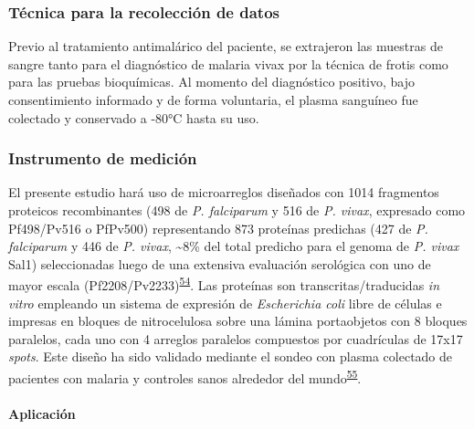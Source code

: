 \documentclass[]{article}
\let\oldparagraph\paragraph
\renewcommand{\paragraph}[1]{\oldparagraph{#1}\mbox{}}
\begin{document}
\subsubsection{Técnica para la recolección de
datos}\label{tecnica-para-la-recoleccion-de-datos}

Previo al tratamiento antimalárico del paciente, se extrajeron las
muestras de sangre tanto para el diagnóstico de malaria vivax por la
técnica de frotis como para las pruebas bioquímicas. Al momento del
diagnóstico positivo, bajo consentimiento informado y de forma
voluntaria, el plasma sanguíneo fue colectado y conservado a -80°C hasta
su uso.

\subsubsection{Instrumento de medición}\label{instrumento-de-medicion}

El presente estudio hará uso de microarreglos diseñados con 1014
fragmentos proteicos recombinantes (498 de \emph{P. falciparum} y 516 de
\emph{P. vivax}, expresado como Pf498/Pv516 o PfPv500) representando 873
proteínas predichas (427 de \emph{P. falciparum} y 446 de \emph{P.
vivax}, \textasciitilde{}8\% del total predicho para el genoma de
\emph{P. vivax} Sal1) seleccionadas luego de una extensiva evaluación
serológica con uno de mayor escala
(Pf2208/Pv2233)\textsuperscript{\protect\hyperlink{ref-Finney2014}{54}}.
Las proteínas son transcritas/traducidas \emph{in vitro} empleando un
sistema de expresión de \emph{Escherichia coli} libre de células e
impresas en bloques de nitrocelulosa sobre una lámina portaobjetos con 8
bloques paralelos, cada uno con 4 arreglos paralelos compuestos por
cuadrículas de 17x17 \emph{spots}. Este diseño ha sido validado mediante
el sondeo con plasma colectado de pacientes con malaria y controles
sanos alrededor del
mundo\textsuperscript{\protect\hyperlink{ref-King2015FOC}{55}}.

\paragraph{Aplicación}\label{aplicacion}
\end{document}
